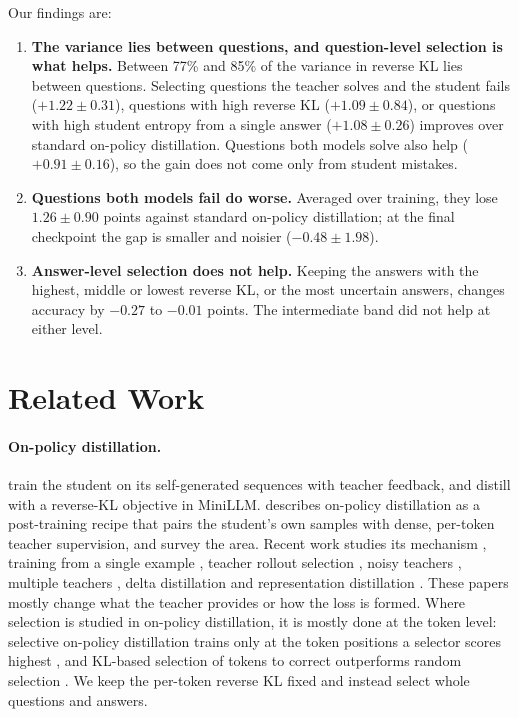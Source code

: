 \documentclass[11pt]{article}
\begin{document}
Our findings are:
\begin{enumerate}
\item \textbf{The variance lies between questions, and question-level selection is what helps.} Between 77\% and 85\% of the variance in reverse KL lies between questions. Selecting questions the teacher solves and the student fails ($+1.22 \pm 0.31$), questions with high reverse KL ($+1.09 \pm 0.84$), or questions with high student entropy from a single answer ($+1.08 \pm 0.26$) improves over standard on-policy distillation. Questions both models solve also help ($+0.91 \pm 0.16$), so the gain does not come only from student mistakes.
\item \textbf{Questions both models fail do worse.} Averaged over training, they lose $1.26 \pm 0.90$ points against standard on-policy distillation; at the final checkpoint the gap is smaller and noisier ($-0.48 \pm 1.98$).
\item \textbf{Answer-level selection does not help.} Keeping the answers with the highest, middle or lowest reverse KL, or the most uncertain answers, changes accuracy by $-0.27$ to $-0.01$ points. The intermediate band did not help at either level.
\end{enumerate}

\section{Related Work}
\label{sec:related}

\paragraph{On-policy distillation.}
\citet{agarwal2024gkd} train the student on its self-generated sequences with teacher feedback, and \citet{gu2024minillm} distill with a reverse-KL objective in MiniLLM.
\citet{lu2025opd} describes on-policy distillation as a post-training recipe that pairs the student's own samples with dense, per-token teacher supervision, and \citet{song2026survey} survey the area.
Recent work studies its mechanism \citep{li2026rethinking}, training from a single example \citep{fu2026onetraining}, teacher rollout selection \citep{zhang2026bestofn}, noisy teachers \citep{ding2026noisy}, multiple teachers \citep{ma2026mopd}, delta distillation \citep{heo2026delta} and representation distillation \citep{yang2026oprd}.
These papers mostly change what the teacher provides or how the loss is formed.
Where selection is studied in on-policy distillation, it is mostly done at the token level: selective on-policy distillation trains only at the token positions a selector scores highest \citep{zhu2026sharedlr}, and KL-based selection of tokens to correct outperforms random selection \citep{li2026demystifying}.
We keep the per-token reverse KL fixed and instead select whole questions and answers.
\end{document}
